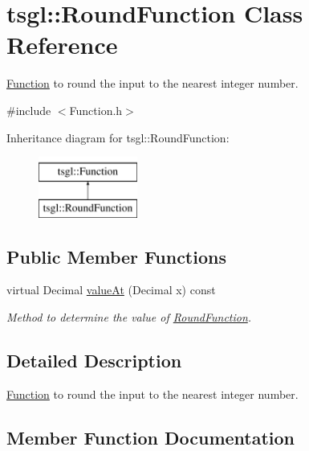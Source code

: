 \hypertarget{classtsgl_1_1_round_function}{}\section{tsgl\+:\+:Round\+Function Class Reference}
\label{classtsgl_1_1_round_function}


\hyperlink{classtsgl_1_1_function}{Function} to round the input to the nearest integer number.  




{\ttfamily \#include $<$Function.\+h$>$}

Inheritance diagram for tsgl\+:\+:Round\+Function\+:\begin{figure}[H]
\begin{center}
\leavevmode
\includegraphics[height=2.000000cm]{classtsgl_1_1_round_function}
\end{center}
\end{figure}
\subsection*{Public Member Functions}
\begin{DoxyCompactItemize}
\item 
virtual Decimal \hyperlink{classtsgl_1_1_round_function_a3047ee723fae828d9379d946012028ca}{value\+At} (Decimal x) const 
\begin{DoxyCompactList}\small\item\em Method to determine the value of \hyperlink{classtsgl_1_1_round_function}{Round\+Function}. \end{DoxyCompactList}\end{DoxyCompactItemize}


\subsection{Detailed Description}
\hyperlink{classtsgl_1_1_function}{Function} to round the input to the nearest integer number. 

\subsection{Member Function Documentation}
\hypertarget{classtsgl_1_1_round_function_a3047ee723fae828d9379d946012028ca}{}
